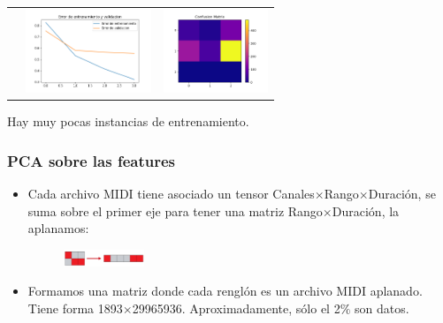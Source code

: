 \documentclass{beamer}
\theoremstyle{plain}
\numberwithin{equation}{section} %
\numberwithin{figure}{section} %
\numberwithin{table}{section} %
\begin{document}
{\begin{frame}
\begin{table}[h!]
\begin{center}
\begin{tabular}{ccc}
 &
\begin{minipage}{.3\textwidth}
\includegraphics[width=\linewidth, height=25mm]{02-TE.png}
\end{minipage}

&

\begin{minipage}{.3\textwidth}
\includegraphics[width=\linewidth, height=25mm]{02-CM.png}
\end{minipage}
\\
\end{tabular}
\end{center}
\end{table}

Hay muy pocas instancias de entrenamiento.

\end{frame}


\begin{frame}
\frametitle{PCA sobre las features}

\begin{itemize}
\justifying
\item Cada archivo MIDI tiene asociado un tensor Canales$\times$Rango$\times$Duraci\'on, se suma sobre el primer eje para tener una matriz Rango$\times$Duraci\'on, la aplanamos:

\begin{figure}[H]
\includegraphics[height=5mm]{Flatten.png}
\end{figure}

\item Formamos una matriz donde cada rengl\'on es un archivo MIDI aplanado. Tiene forma 1893$\times$29965936. Aproximadamente, s\'olo el 2$\%$ son datos. 

\medskip


\end{itemize}
\end{frame}}
\end{document}
